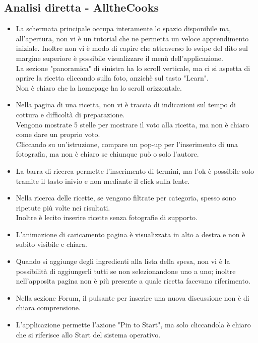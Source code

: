 \documentclass[12pt,a4paper,openright,twoside]{article}
\begin{document}
\subsection*{Analisi diretta - AlltheCooks}

\begin{itemize}
\item La schermata principale occupa interamente lo spazio disponibile ma, all'apertura, non vi è un tutorial che ne permetta un veloce apprendimento iniziale. Inoltre non vi è modo di capire che attraverso lo swipe del dito sul margine superiore è possibile visualizzare il menù dell'applicazione.\\La sezione "panoramica" di sinistra ha lo scroll verticale, ma ci si aspetta di aprire la ricetta cliccando sulla foto, anzichè sul tasto "Learn".\\Non è chiaro che la homepage ha lo scroll orizzontale.

\item Nella pagina di una ricetta, non vi è traccia di indicazioni sul tempo di cottura e difficoltà di preparazione.\\
Vengono mostrate 5 stelle per mostrare il voto alla ricetta, ma non è chiaro come dare un proprio voto.\\
Cliccando su un'istruzione, compare un pop-up per l'inserimento di una fotografia, ma non è chiaro se chiunque può o solo l'autore.\\

\item La barra di ricerca permette l'inserimento di termini, ma l'ok è possibile solo tramite il tasto inivio e non mediante il click sulla lente.

\item Nella ricerca delle ricette, se vengono filtrate per categoria, spesso sono ripetute più volte nei risultati.\\Inoltre è lecito inserire ricette senza fotografie di supporto.

\item L'animazione di caricamento pagina è visualizzata in alto a destra e non è subito visibile e chiara.

\item Quando si aggiunge degli ingredienti alla lista della spesa, non vi è la possibilità di aggiungerli tutti se non selezionandone uno a uno; inoltre nell'apposita pagina non è più presente a quale ricetta facevano riferimento.

\item Nella sezione Forum, il pulsante per inserire una nuova discussione non è di chiara comprensione.

\item L'applicazione permette l'azione "Pin to Start", ma solo cliccandola è chiaro che si riferisce allo Start del sistema operativo.

\end{itemize}
\end{document}
